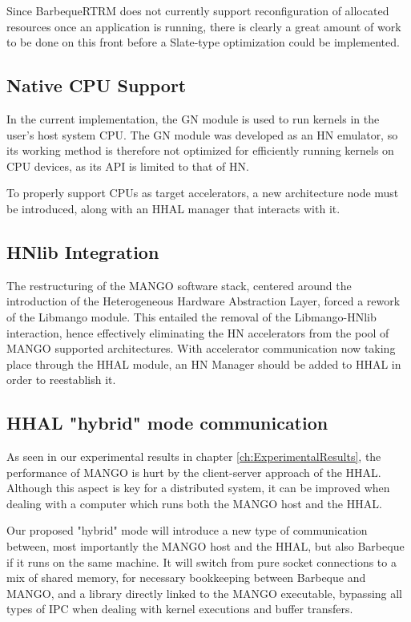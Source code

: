 Since BarbequeRTRM does not currently support reconfiguration of allocated resources once an application is running, there is clearly a great amount of work to be done on this front before a Slate-type optimization could be implemented.

\subsection{Native CPU Support}

In the current implementation, the GN module is used to run kernels in the user's host system CPU. The GN module was developed as an HN emulator, so its working method is therefore not optimized for efficiently running kernels on CPU devices, as its API is limited to that of HN.

To properly support CPUs as target accelerators, a new architecture node must be introduced, along with an HHAL manager that interacts with it.

\subsection{HNlib Integration}

The restructuring of the MANGO software stack, centered around the introduction of the Heterogeneous Hardware Abstraction Layer, forced a rework of the Libmango module. This entailed the removal of the Libmango-HNlib interaction, hence effectively eliminating the HN accelerators from the pool of MANGO supported architectures.
With accelerator communication now taking place through the HHAL module, an HN Manager should be added to HHAL in order to reestablish it.

\subsection{HHAL "hybrid" mode communication} \label{sub-sect:hhal-hybrid-mode}

As seen in our experimental results in chapter \ref{ch:ExperimentalResults}, the performance of MANGO is hurt by the client-server approach of the HHAL. Although this aspect is key for a distributed system, it can be improved when dealing with a computer which runs both the MANGO host and the HHAL. 

Our proposed "hybrid" mode will introduce a new type of communication between, most importantly the MANGO host and the HHAL, but also Barbeque if it runs on the same machine. It will switch from pure socket connections to a mix of shared memory, for necessary bookkeeping between Barbeque and MANGO, and a library directly linked to the MANGO executable, bypassing all types of IPC when dealing with kernel executions and buffer transfers.

